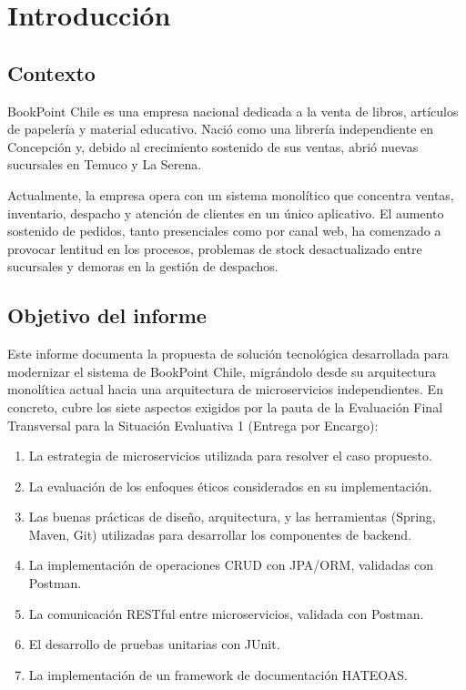 \chapter{Introducción}

\section{Contexto}

BookPoint Chile es una empresa nacional dedicada a la venta de libros, artículos de
papelería y material educativo. Nació como una librería independiente en Concepción y,
debido al crecimiento sostenido de sus ventas, abrió nuevas sucursales en Temuco y La
Serena.

Actualmente, la empresa opera con un sistema monolítico que concentra ventas,
inventario, despacho y atención de clientes en un único aplicativo. El aumento
sostenido de pedidos, tanto presenciales como por canal web, ha comenzado a provocar
lentitud en los procesos, problemas de stock desactualizado entre sucursales y demoras
en la gestión de despachos.

\section{Objetivo del informe}

Este informe documenta la propuesta de solución tecnológica desarrollada para
modernizar el sistema de BookPoint Chile, migrándolo desde su arquitectura monolítica
actual hacia una arquitectura de microservicios independientes. En concreto, cubre los
siete aspectos exigidos por la pauta de la Evaluación Final Transversal para la
Situación Evaluativa 1 (Entrega por Encargo):

\begin{enumerate}
    \item La estrategia de microservicios utilizada para resolver el caso propuesto.
    \item La evaluación de los enfoques éticos considerados en su implementación.
    \item Las buenas prácticas de diseño, arquitectura, y las herramientas (Spring,
    Maven, Git) utilizadas para desarrollar los componentes de backend.
    \item La implementación de operaciones CRUD con JPA/ORM, validadas con Postman.
    \item La comunicación RESTful entre microservicios, validada con Postman.
    \item El desarrollo de pruebas unitarias con JUnit.
    \item La implementación de un framework de documentación HATEOAS.
\end{enumerate}

